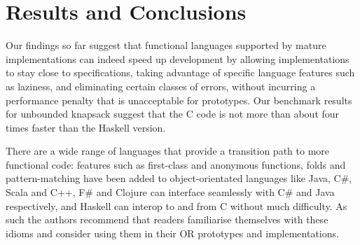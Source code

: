 \section{Results and Conclusions}

Our findings so far suggest that functional languages supported by mature
implementations can indeed speed up development by allowing implementations to
stay close to specifications, taking advantage of specific language features
such as laziness, and eliminating certain classes of errors, without incurring
a performance penalty that is unacceptable for prototypes. Our
benchmark results for unbounded knapsack suggest that the C
code is not more than about four times faster than the Haskell version.

There are a wide range of languages that provide a transition path to more functional code: features such as first-class and anonymous functions, folds and pattern-matching have been added to object-orientated languages like Java, C\#, Scala and C++, F\# and Clojure can interface seamlessly with C\# and Java respectively, and Haskell can interop to and from C without much difficulty. As such the authors recommend that readers familiarise themselves with these idioms and consider using them in their OR prototypes and implementations.
